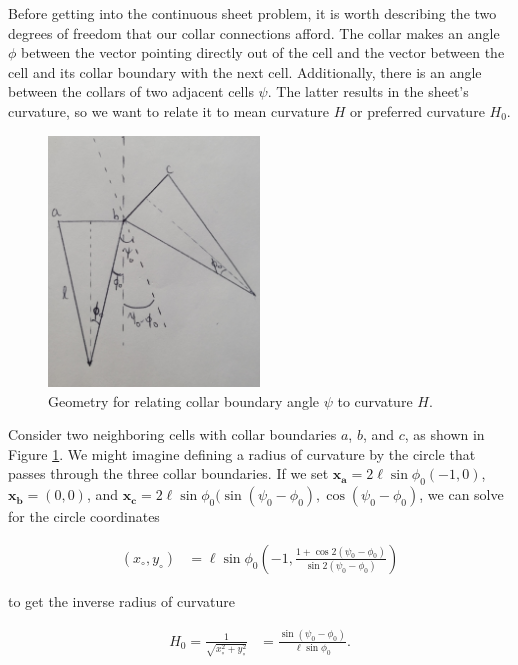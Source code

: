 \documentclass[draft]{article}
\begin{document}
Before getting into the continuous sheet problem, it is worth describing the two degrees of freedom that our collar connections afford. The collar makes an angle $\phi$ between the vector pointing directly out of the cell and the vector between the cell and its collar boundary with the next cell. Additionally, there is an angle between the collars of two adjacent cells $\psi$. The latter results in the sheet's curvature, so we want to relate it to mean curvature $H$ or preferred curvature $H_0$. 

\begin{figure}[htbp]
    \centering
    \includegraphics[width=0.5\textwidth]{figures/hpsi.jpg}
    \caption{Geometry for relating collar boundary angle $\psi$ to curvature $H$. }
    \label{fig:hpsi}
\end{figure}

Consider two neighboring cells with collar boundaries $a$, $b$, and $c$, as shown in Figure \ref{fig:hpsi}. We might imagine defining a radius of curvature by the circle that passes through the three collar boundaries. If we set $\bm{x_a} = 2\ell\sin\phi_0(-1, 0)$, $\bm{x_b} = (0,0)$, and $\bm{x_c} = 2\ell\sin\phi_0 (\sin(\psi_0 - \phi_0), \cos(\psi_0-\phi_0)$, we can solve for the circle coordinates 

\begin{align*}
    (x_\circ, y_\circ) &= \ell \sin\phi_0\left(-1, \frac{1+\cos2(\psi_0 - \phi_0)}{\sin2(\psi_0 - \phi_0)} \right)
\end{align*}

\noindent to get the inverse radius of curvature 

\begin{align}
    H_0 = \frac{1}{\sqrt{x_\circ^2 + y_\circ^2}} &= \frac{\sin(\psi_0 - \phi_0)}{\ell \sin\phi_0}. 
\end{align}
\end{document}
